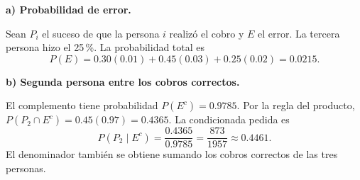 \textbf{a) Probabilidad de error.}\par\nopagebreak[4]
Sean $P_i$ el suceso de que la persona $i$ realizó el cobro y $E$ el error. La tercera persona hizo el 25\,\%. La probabilidad total es
\[
\boxed{P(E)=0.30(0.01)+0.45(0.03)+0.25(0.02)=0.0215.}
\]

\textbf{b) Segunda persona entre los cobros correctos.}\par\nopagebreak[4]
El complemento tiene probabilidad $P(E^c)=0.9785$. Por la regla del producto, $P(P_2\cap E^c)=0.45(0.97)=0.4365$. La condicionada pedida es
\[
\boxed{P(P_2\mid E^c)=\frac{0.4365}{0.9785}=\frac{873}{1957}\approx0.4461.}
\]
El denominador también se obtiene sumando los cobros correctos de las tres personas.
